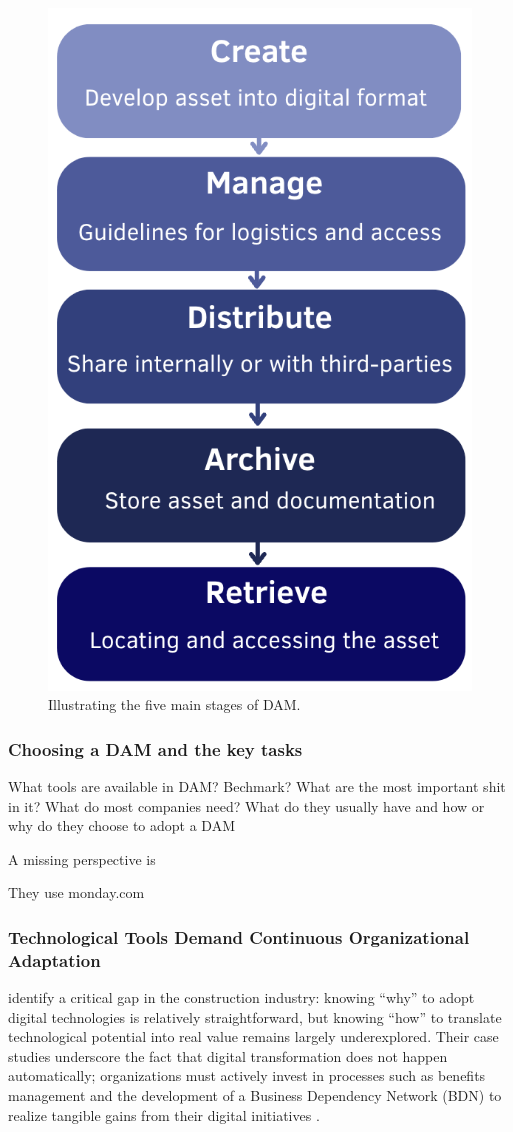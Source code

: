 \documentclass[a4paper,10pt,twocolumn]{article}
\numberwithin{figure}{section}
\numberwithin{table}{section}
\begin{document}
\begin{figure}[htbp]
    \centering
    \includegraphics[width=0.5\linewidth]{4steg.png}  %
    \caption{Illustrating the five main stages of DAM.}
    \label{fig:4steg}  
\end{figure}

\vspace{0.3cm}
\subsubsection{Choosing a DAM and the key tasks}
\vspace{0.3cm}
What tools are available in DAM? 
Bechmark? 
What are the most important shit in it?
What do most companies need? 
What do they usually have and how or 
why do they choose to adopt a DAM

A missing perspective is 

They use monday.com

\vspace{0.3cm}
\subsubsection{Technological Tools Demand Continuous Organizational Adaptation}
\vspace{0.3cm}

\cite{LOVE2019102930} identify a critical gap in the construction industry: knowing “why” 
to adopt digital technologies is relatively straightforward, but knowing “how” to translate 
technological potential into real value remains largely underexplored. Their case studies underscore 
the fact that digital transformation does not happen automatically; organizations must actively
 invest in processes such as benefits management and the development of a Business Dependency 
 Network (BDN) to realize tangible gains from their digital initiatives \citep{LOVE2019102930}.
\end{document}
